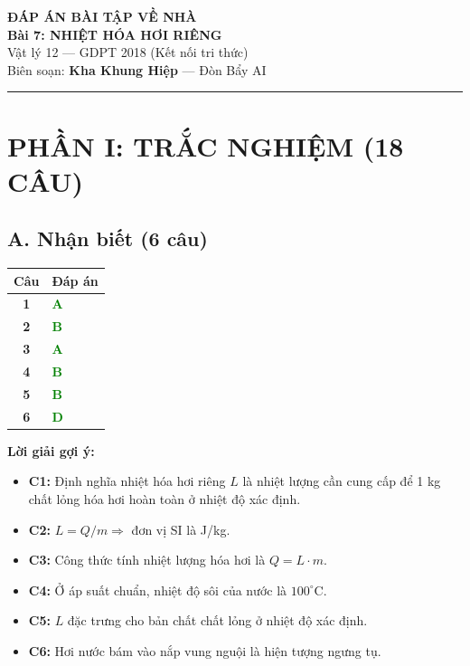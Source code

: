 \documentclass[12pt,a4paper]{article}
\newcommand{\dapan}[1]{\textcolor{green}{\textbf{#1}}}
\begin{document}
\begin{center}
    {\LARGE \textbf{ĐÁP ÁN BÀI TẬP VỀ NHÀ}}\\[4pt]
    {\Large \textbf{Bài 7: NHIỆT HÓA HƠI RIÊNG}}\\[4pt]
    {\normalsize Vật lý 12 — GDPT 2018 (Kết nối tri thức)}\\[4pt]
    {\small Biên soạn: \textbf{Kha Khung Hiệp} — Đòn Bẩy AI}
\end{center}

\vspace{1em}
\hrule
\vspace{1em}


\section*{PHẦN I: TRẮC NGHIỆM (18 CÂU)}

\subsection*{A. Nhận biết (6 câu)}

\begin{longtable}{>{\bfseries}cl}
\toprule
Câu & Đáp án \\ \midrule
1 & \dapan{A} \\ 
2 & \dapan{B} \\ 
3 & \dapan{A} \\ 
4 & \dapan{B} \\ 
5 & \dapan{B} \\ 
6 & \dapan{D} \\ \bottomrule
\end{longtable}

\noindent\textbf{Lời giải gợi ý:}
\begin{itemize}
    \item \textbf{C1:} Định nghĩa nhiệt hóa hơi riêng $L$ là nhiệt lượng cần cung cấp để 1 kg chất lỏng hóa hơi hoàn toàn ở nhiệt độ xác định.
    \item \textbf{C2:} $L = Q/m \Rightarrow$ đơn vị SI là J/kg.
    \item \textbf{C3:} Công thức tính nhiệt lượng hóa hơi là $Q = L \cdot m$.
    \item \textbf{C4:} Ở áp suất chuẩn, nhiệt độ sôi của nước là $100^{\circ}\text{C}$.
    \item \textbf{C5:} $L$ đặc trưng cho bản chất chất lỏng ở nhiệt độ xác định.
    \item \textbf{C6:} Hơi nước bám vào nắp vung nguội là hiện tượng ngưng tụ.
\end{itemize}
\end{document}
